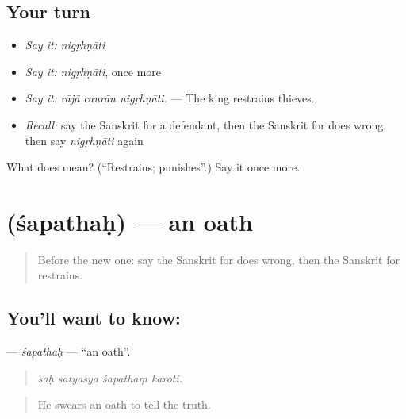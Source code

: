 \subsection*{Your turn}
\begin{itemize}
\raggedright
  \item \emph{Say it:} \emph{nigṛhṇāti}
  \item \emph{Say it:} \emph{nigṛhṇāti}, once more
  \item \emph{Say it:} \emph{rājā caurān nigṛhṇāti.} — The king restrains thieves.
  \item \emph{Recall:} say the Sanskrit for a defendant, then the Sanskrit for does wrong, then say \emph{nigṛhṇāti} again
\end{itemize}

\begin{tcolorbox}[breakable,colback=teal!4,colframe=teal!35!black,title={Before you move on}]
What does  mean? (\textquotedblleft{}Restrains; punishes\textquotedblright{}.) Say it once more.
\end{tcolorbox}
\section[\texorpdfstring{\sk{शपथः} (śapathaḥ)}{शपथः (śapathaḥ)}]{ (śapathaḥ) — an oath}

\label{lesson:SA-C349-sapathah}



\begin{quote}
Before the new one: say the Sanskrit for does wrong, then the Sanskrit for restrains.
\end{quote}

\subsection*{You'll want to know: }
\textbf{} — \emph{śapathaḥ} — \textquotedblleft{}an oath\textquotedblright{}.

\begin{quote}
   
\end{quote}

\begin{quote}
\emph{saḥ satyasya śapathaṃ karoti.}
\end{quote}

\begin{quote}
He swears an oath to tell the truth.
\end{quote}

